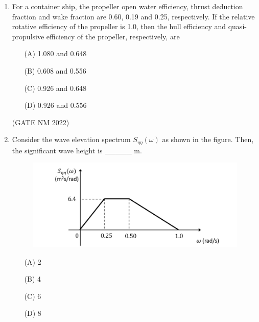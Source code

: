\documentclass[journal,12pt,onecolumn]{IEEEtran}
\theoremstyle{remark}
\begin{document}
\begin{enumerate}
\begin{multicols}{2}
	\end{multicols}

\hfill(GATE NM 2022)










\item  For a container ship, the propeller open water efficiency, thrust deduction fraction and wake fraction are 0.60, 0.19 and 0.25, respectively.  
If the relative rotative efficiency of the propeller is 1.0, then the hull efficiency and quasi-propulsive efficiency of the propeller, respectively, are

\begin{multicols}{2}

\begin{enumerate}
    \item[(A)] 1.080 and 0.648
    \item[(B)] 0.608 and 0.556
    \item[(C)] 0.926 and 0.648
    \item[(D)] 0.926 and 0.556
\end{enumerate}

\end{multicols}

\hfill(GATE NM 2022)









\item  Consider the wave elevation spectrum $S_{\eta\eta}(\omega)$ as shown in the figure.  
Then, the significant wave height is \_\_\_\_\_ m.

\begin{figure}[h]
    \centering
	\includegraphics[width=0.6\columnwidth]{fig5}
	\caption{}
	\label{fig:placeholder}
\end{figure}

\begin{multicols}{4}

\begin{enumerate}
    \item[(A)] 2
    \item[(B)] 4
    \item[(C)] 6
    \item[(D)] 8
\end{enumerate}


\end{multicols}
\end{enumerate}
\end{document}
